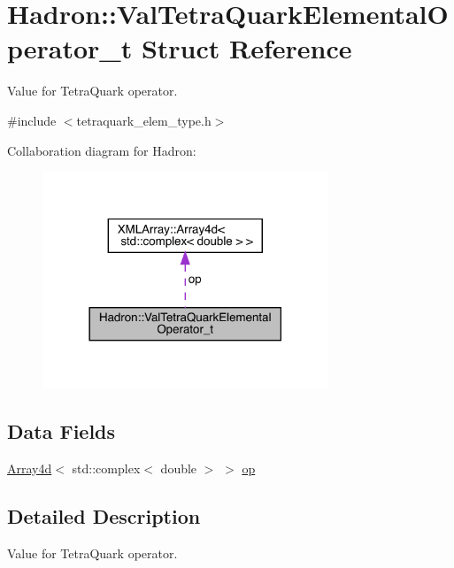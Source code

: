 \hypertarget{structHadron_1_1ValTetraQuarkElementalOperator__t}{}\section{Hadron\+:\+:Val\+Tetra\+Quark\+Elemental\+Operator\+\_\+t Struct Reference}
\label{structHadron_1_1ValTetraQuarkElementalOperator__t}


Value for Tetra\+Quark operator.  




{\ttfamily \#include $<$tetraquark\+\_\+elem\+\_\+type.\+h$>$}



Collaboration diagram for Hadron\+:\nopagebreak
\begin{figure}[H]
\begin{center}
\leavevmode
\includegraphics[width=242pt]{d5/df2/structHadron_1_1ValTetraQuarkElementalOperator__t__coll__graph}
\end{center}
\end{figure}
\subsection*{Data Fields}
\begin{DoxyCompactItemize}
\item 
\mbox{\hyperlink{classXMLArray_1_1Array4d}{Array4d}}$<$ std\+::complex$<$ double $>$ $>$ \mbox{\hyperlink{structHadron_1_1ValTetraQuarkElementalOperator__t_aa84effaf85576ba8df20869ed465a59e}{op}}
\end{DoxyCompactItemize}


\subsection{Detailed Description}
Value for Tetra\+Quark operator. 

